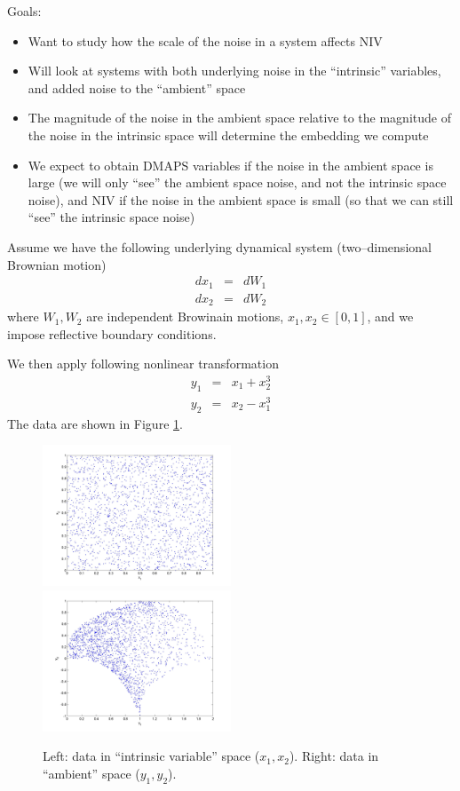 \documentclass[12pt]{article}
\begin{document}
Goals: 
\begin{itemize}
\item Want to study how the scale of the noise in a system affects NIV
\item Will look at systems with both underlying noise in the ``intrinsic'' variables, and added noise to the ``ambient'' space
\item The magnitude of the noise in the ambient space relative to the magnitude of the noise in the intrinsic space will determine the embedding we compute
\item We expect to obtain DMAPS variables if the noise in the ambient space is large (we will only ``see'' the ambient space noise, and not the intrinsic space noise), and NIV if the noise in the ambient space is small (so that we can still ``see'' the intrinsic space noise)
\end{itemize}


Assume we have the following underlying dynamical system (two--dimensional Brownian motion)
\begin{eqnarray}
	dx_1 & = & dW_1 \\
	dx_2 & = & dW_2
\end{eqnarray}
where $W_1, W_2$ are independent Browinain motions, $x_1, x_2 \in [0, 1]$, and we impose reflective boundary conditions.

We then apply following nonlinear transformation
%
\begin{eqnarray}
y_1 & = & x_1 + x_2^3 \\
y_2 & = & x_2 - x_1^3
\end{eqnarray}
%
The data are shown in Figure \ref{fig:data}.

\begin{figure}[htb]
\includegraphics[width=0.5\textwidth]{xdata}
\includegraphics[width=0.5\textwidth]{ydata}
\caption{Left: data in ``intrinsic variable'' space ($x_1, x_2$). Right: data in ``ambient'' space ($y_1, y_2$).}
\label{fig:data}
\end{figure}
\end{document}
